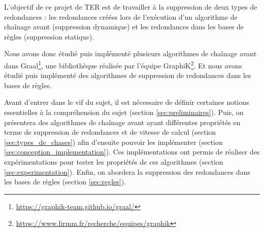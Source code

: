 \par L'objectif de ce projet de TER est de travailler à la suppression de deux types de redondances : les redondances créées lors de l'exécution d'un algorithme de chaînage avant (suppression dynamique) et les redondances dans les bases de règles (suppression statique).
\par Nous avons donc étudié puis implémenté plusieurs algorithmes de chaînage avant dans Graal\footnote{\url{https://graphik-team.github.io/graal/}}, une bibliothèque réalisée par l'équipe GraphiK\footnote{\url{https://www.lirmm.fr/recherche/equipes/graphik}}. Et nous avons étudié puis implémenté des algorithmes de suppression de redondances dans les bases de règles.

\par Avant d'entrer dans le vif du sujet, il est nécessaire de définir certaines notions essentielles à la compréhension du sujet (section \ref{sec:preliminaires}). Puis, on présentera des algorithmes de chaînage avant ayant différentes propriétés en terme de suppression de redondances et de vitesse de calcul (section \ref{sec:types_de_chases}) afin d'ensuite pouvoir les implémenter (section \ref{sec:conception_implementation}). Ces implémentations ont permis de réaliser des expérimentations pour tester les propriétés de ces algorithmes (section \ref{sec:experimentation}). Enfin, on abordera la suppression des redondances dans les bases de règles (section \ref{sec:regles}).


